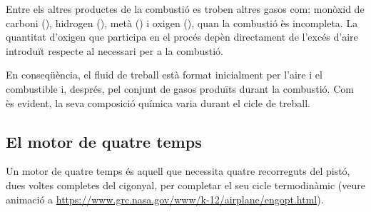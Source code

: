 Entre els altres productes de la combusti\'o es troben altres gasos com: mon\`oxid de carboni (), hidrogen (), metà () i oxigen (), quan la combusti\'o \`es incompleta. La quantitat d'oxigen que participa en el proc\'es dep\`en directament de l'exc\'es d'aire introdu\"it respecte al necessari per a la combusti\'o.

En conseq\"u\`encia, el fluid de treball est\`a format inicialment per l'aire i el combustible i, despr\'es, pel conjunt de gasos produ\"its durant la combusti\'o. Com \`es evident, la seva composici\'o qu\'imica varia durant el cicle de treball.


\subsection{El motor de quatre temps}

    Un motor de quatre temps és aquell que necessita quatre recorreguts del pistó, dues voltes completes del cigonyal, per completar el seu cicle termodinàmic (veure animació a \url{https://www.grc.nasa.gov/www/k-12/airplane/engopt.html}).

